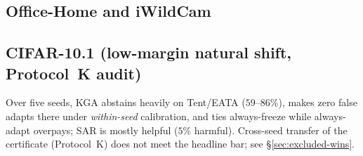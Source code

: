 \subsection{Office-Home and iWildCam}
\begin{table}[h]\centering\footnotesize
{}
\caption{Office-Home: zero false-adapts; no beats-both (invalid transfer evidence).}
\label{tab:officehome}
\end{table}

\begin{table}[h]\centering\footnotesize
{}
\caption{iWildCam: \textbf{diagnostic} multicandidate route on val/test vs \textbf{headline}
Protocol~H v2 canonical \textsc{KGA} on test (Table~\ref{tab:iwildcam-H} in main text).}
\label{tab:iwildcam}
\end{table}

\subsection{CIFAR-10.1 (low-margin natural shift, Protocol~K audit)}
Over five seeds, \textsc{KGA} abstains heavily on Tent/EATA ($59$--$86\%$), makes zero false
adapts there under \emph{within-seed} calibration, and ties always-freeze while always-adapt
overpays; SAR is mostly helpful ($5\%$ harmful). Cross-seed transfer of the certificate
(Protocol~K) does not meet the headline bar; see \S\ref{sec:excluded-wins}.

